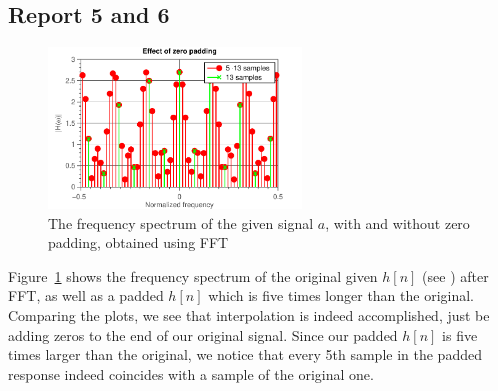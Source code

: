 \documentclass[11pt,titlepage]{report}
\begin{document}
\subsection{Report 5 and 6}

\begin{figure}[H]
	\centering
	\includegraphics[width=0.6\textwidth]{../../deliverable-7-resources/figures/ass-1/report-5-6/ass-1-report-5-6.pdf}
	\caption{The frequency spectrum of the given signal $a$, with and without zero padding, obtained using FFT}
	\label{fig:rep5-6-spectrum}
\end{figure}
Figure~\ref{fig:rep5-6-spectrum} shows the frequency spectrum of the original given $h[n]$ (see \cite[94]{epo4-manual}) after FFT, as well as a padded $h[n]$ which is five times longer than the original. Comparing the plots, we see that interpolation is indeed accomplished, just be adding zeros to the end of our original signal. Since our padded $h[n]$ is five times larger than the original, we notice that every 5th sample in the padded response indeed coincides with a sample of the original one.
\end{document}

